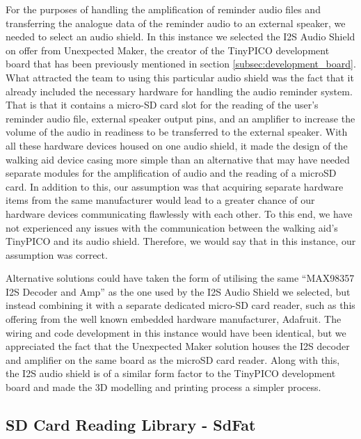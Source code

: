             For the purposes of handling the amplification of reminder audio files and transferring the analogue data of the reminder audio to an external speaker, we needed to select an audio shield. In this instance we selected the I2S Audio Shield \cite{unexpected_maker} on offer from Unexpected Maker, the creator of the TinyPICO development board that has been previously mentioned in section \ref{subsec:development_board}. What attracted the team to using this particular audio shield was the fact that it already included the necessary hardware for handling the audio reminder system. That is that it contains a micro-SD card slot for the reading of the user's reminder audio file, external speaker output pins, and an amplifier to increase the volume of the audio in readiness to be transferred to the external speaker. With all these hardware devices housed on one audio shield, it made the design of the walking aid device casing more simple than an alternative that may have needed separate modules for the amplification of audio and the reading of a microSD card. In addition to this, our assumption was that acquiring separate hardware items from the same manufacturer would lead to a greater chance of our hardware devices communicating flawlessly with each other. To this end, we have not experienced any issues with the communication between the walking aid's TinyPICO and its audio shield. Therefore, we would say that in this instance, our assumption was correct.
            
            Alternative solutions could have taken the form of utilising the same ``MAX98357 I2S Decoder and Amp'' \cite{unexpected_maker} as the one used by the I2S Audio Shield we selected, but instead combining it with a separate dedicated micro-SD card reader, such as this offering \cite{ada_2022} from the well known embedded hardware manufacturer, Adafruit. The wiring and code development in this instance would have been identical, but we appreciated the fact that the Unexpected Maker solution houses the I2S decoder and amplifier on the same board as the microSD card reader. Along with this, the I2S audio shield is of a similar form factor to the TinyPICO development board and made the 3D modelling and printing process a simpler process.

        \subsection{SD Card Reading Library - SdFat}
        \label{subsec:sdfat}

